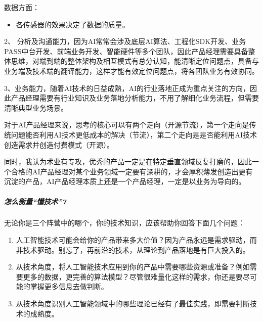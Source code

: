 \documentclass[letterpaper,11pt,english]{sphinxmanual}
\begin{document}
数据方面：
\begin{itemize}
\item {} 
各传感器的效果决定了数据的质量。

\end{itemize}

2、
分析及沟通能力，因为AI常常会涉及底层AI算法、工程化SDK开发、业务PASS中台开发、前端业务开发、智能硬件等多个团队，因此产品经理需要具备整体思维，对端到端的整体架构及相互模式有总分认知，能清晰定位问题点，具备与业务端及技术端的翻译能力，这样才能有效定位问题点，将各团队业务有效协同。

3、业务能力，随着AI技术的日益成熟，AI的行业落地正成为重点关注的方向，因此产品经理需要有行业知识及业务落地分析能力，不用了解细化业务流程，但需要清晰典型业务场景。

对于AI产品经理来说，思考的核心可以有两个走向（开源节流），第一个走向是传统问题能否利用AI技术更低成本的解决（节流），第二个走向是是否能利用AI技术创造需求并创造付费模式（开源）。

同时，我认为术业有专攻，优秀的产品一定是在特定垂直领域反复打磨的，因此一个合格的AI产品经理对某个业务领域一定要有深耕的，才会厚积薄发创造出更有沉淀的产品，AI产品经理本质上还是一个产品经理，一定是以业务为导向的。


\subparagraph{怎么衡量“懂技术”7\sphinxfootnotemark[85]}
\label{\detokenize{chapter_introduction/AI_PM:id10}}%
\begin{footnotetext}[85]\sphinxAtStartFootnote
{}
%
\end{footnotetext}\ignorespaces 
无论你是三个阵营中的哪个，你的技术知识，应该帮助你回答下面几个问题：
\begin{enumerate}
%
\item {} 
人工智能技术可能会给你的产品带来多大价值？因为产品永远是需求驱动，而非技术驱动。别忘了，再前沿的技术，从理论到产品落地是有巨大投入的。

\item {} 
从技术角度，将人工智能技术应用到你的产品中需要哪些资源或准备？例如需要更多的数据，更完善的算法模型？尽管很难量化这样的需求，你还是要尽可能的掌握更多信息去做判断。

\item {} 
从技术角度识别人工智能领域中的哪些理论已经有了最佳实践，即需要判断技术的成熟度。

\end{enumerate}
\end{document}
